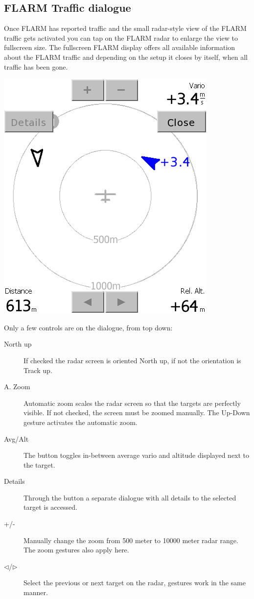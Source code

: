 \subsection*{FLARM Traffic dialogue}\label{sec:flarm-traffic}

Once FLARM has reported traffic and the small radar-style view of the FLARM
traffic gets activated   you can tap on the FLARM radar to
enlarge the view to fullscreen size.
The fullscreen FLARM display offers all available information
about the FLARM traffic and depending on the setup it closes by itself, when all
traffic has been gone.

\begin{center}
\includegraphics[angle=0,width=0.5\linewidth,keepaspectratio='true']{figures/dialog-flarm1.png}
\end{center}

Only a few controls are on the dialogue, from top down:
\begin{description}
\item[North up]  If checked the radar screen is oriented North up, if not the
orientation is Track up.
\item[A. Zoom]   Automatic zoom scales the radar screen so
that the targets are perfectly visible. If not checked, the screen must be
zoomed manually. The Up-Down gesture activates the automatic zoom.
\item[Avg/Alt]   The button toggles in-between average
vario and altitude displayed next to the target.
\item[Details]   Through the button a separate dialogue with
all details to the selected target is accessed.
\item[+/-]   Manually change the zoom from 500 meter to
10000 meter radar range. The zoom gestures also apply here.
\item[$\triangleleft$/$\triangleright$]   Select the
previous or next target on the radar, gestures work in the same manner.
\end{description}

